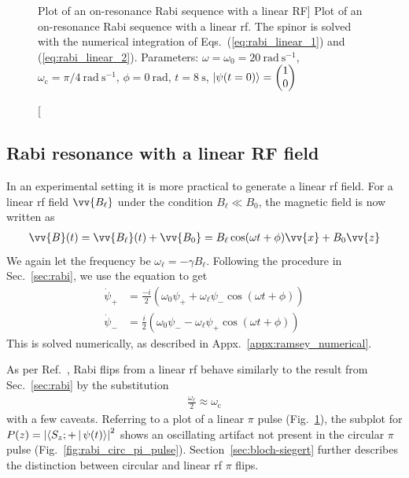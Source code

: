 \begin{figure}
\begin{subfigure}{.45\textwidth}
\end{subfigure}
\caption
[Plot of an on-resonance Rabi sequence with a linear RF]
{Plot of an on-resonance Rabi sequence with a linear \acrshort{rf}. The spinor is solved with the numerical integration of Eqs.~(\ref{eq:rabi_linear_1}) and (\ref{eq:rabi_linear_2}). Parameters: $\omega=\omega_0=\qty{20}{\radian\ \s^{-1}}$, $\omega_\text{c}=\pi/\qty{4}{\radian\ \s^{-1}}$, $\phi=\qty{0}{\radian}$, $t=\qty{8}{\s}$, $\Ket{\psi(t=0)}=\left( \begin{matrix}
    1 \\
    0
\end{matrix}\right)$}
\label{fig:rabi_linear_pi_pulse}
\end{figure}



\subsection{Rabi resonance with a linear RF field}


In an experimental setting it is more practical to generate a linear \acrshort*{rf} field. For a linear \acrshort*{rf} field $\vv{B_\ell}$ under the condition $B_\ell \ll B_0$, the magnetic field is now written as
%
\begin{gather}
    \vv{B}(t)=\vv{B_\ell}(t) + \vv{B_0}=B_\ell \cos (\omega t + \phi) \vv{x} + B_0 \vv{z}\label{eq:B0_with_linear_rf}
\end{gather}
%
We again let the frequency be $\omega_\ell=-\gamma B_\ell$. Following the procedure in Sec.~\ref{sec:rabi}, we use the \schrodinger equation to get
%
\begin{align}
    \dot{\psi}_+ &=\frac{-i}{2}\left( \omega_0 \psi_+ + \omega_\ell \psi_-  \cos(\omega t + \phi) \right)\label{eq:rabi_linear_1}\\
    \dot{\psi}_- &=\frac{i}{2}\left( \omega_0 \psi_- - \omega_\ell \psi_+ \cos(\omega t + \phi)  \right)\label{eq:rabi_linear_2}
\end{align}
%
This is solved numerically, as described in Appx.~\ref{appx:ramsey_numerical}.

As per Ref.~\cite{rabi_1938}, Rabi flips from a linear \acrshort*{rf} behave similarly to the result from  Sec.~\ref{sec:rabi} by the substitution 
%
\begin{gather}
    \frac{\omega_\ell}{2}\approx\omega_\text{c} \label{eq:linear_vs_circular_w}
\end{gather}
%
with a few caveats. Referring to a plot of a linear $\pi$ pulse (Fig.~\ref{fig:rabi_linear_pi_pulse}), the subplot for $P(z)=\left| \Braket{S_z;+ | \psi(t)} \right|^2 $ shows an oscillating artifact not present in the circular $\pi$ pulse (Fig.~\ref{fig:rabi_circ_pi_pulse}). Section~\ref{sec:bloch-siegert} further describes the distinction between circular and linear \acrshort*{rf} $\pi$ flips.


